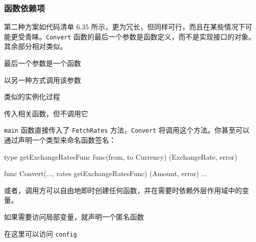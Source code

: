 \subsubsection*{函数依赖项}

第二种方案如代码清单 6.35 所示，更为冗长，但同样可行，而且在某些情况下可能更受青睐。\texttt{Convert} 函数的最后一个参数是函数定义，而不是实现接口的对象。其余部分相对类似。


\begin{codeannotations}
\item 最后一个参数是一个函数
\item 以另一种方式调用该参数
\item 类似的实例化过程
\item 传入相关函数，但不调用它
\end{codeannotations}

\texttt{main} 函数直接传入了 \texttt{FetchRates} 方法，\texttt{Convert} 将调用这个方法。你甚至可以通过声明一个类型来命名函数签名：

\begin{gocode}[]
type getExchangeRatesFunc func(from, to Currency) (ExchangeRate, error)

func Convert(..., rates getExchangeRatesFunc) (Amount, error) {
    ...
}
\end{gocode}

或者，调用方可以自由地即时创建任何函数，并在需要时依赖外层作用域中的变量。


\begin{codeannotations}
\item 如果需要访问局部变量，就声明一个匿名函数
\item 在这里可以访问 \texttt{config}
\end{codeannotations}

